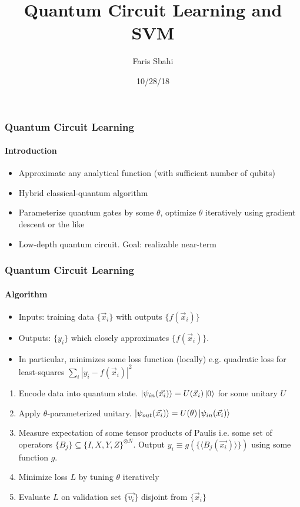 \documentclass{beamer}
\title{Quantum Circuit Learning and SVM}
\author[Sbahi] %
{Faris Sbahi}
\date{10/28/18}
\newcommand\0{\mathbf{0}}
\begin{document}
\maketitle
\begin{frame}
    \frametitle{Quantum Circuit Learning}
    \framesubtitle{Introduction}
    \begin{itemize}
    \item Approximate any analytical function (with sufficient number of qubits)
    \item Hybrid classical-quantum algorithm
    \item Parameterize quantum gates by some $\theta$, optimize $\theta$ iteratively using gradient descent or the like
    \item Low-depth quantum circuit. Goal: realizable near-term
    \end{itemize}

  \end{frame}
  \begin{frame}
    \frametitle{Quantum Circuit Learning}
    \framesubtitle{Algorithm}
    
    \begin{itemize}
    \item Inputs: training data $\{ \vec{x}_i \}$ with outputs $\{ f(\vec{x}_i)\}$
    \item Outputs: $\{y_i\}$ which closely approximates $\{ f(\vec{x}_i)\}$. 
    \item In particular, minimizes some loss function (locally) e.g. quadratic loss for least-squares $\sum_i | y_i - f(\vec{x}_i)|^2$
    \end{itemize}
    \pause
    \begin{enumerate}
    \item Encode data into quantum state. $\ket{\psi_{in}(\vec{x_i})} = U(\vec{x}_i)\ket{0}$ for some unitary $U$
    \item Apply $\theta$-parameterized unitary. $\ket{\psi_{out}(\vec{x_i})} = U(\theta)\ket{\psi_{in}(\vec{x_i})}$
    \item Measure expectation of some tensor products of Paulis i.e. some set of operators $\{B_j \} \subseteq \{I, X, Y, Z\}^{\otimes N}$. Output $y_i \equiv g(\{ \langle B_j(\vec{x_i}) \rangle \})$ using some function $g$.
    \item Minimize loss $L$ by tuning $\theta$ iteratively
    \item Evaluate $L$ on validation set $\{ \vec{v_i} \}$ disjoint from $\{ \vec{x}_i \}$  
    \end{enumerate}
  \end{frame}
  
\end{document}

